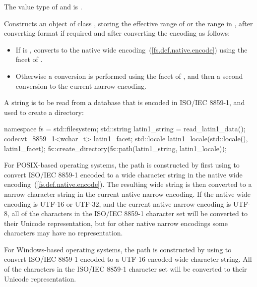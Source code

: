 \begin{itemdescr}
\pnum
\requires
The value type of  and  is
.

\pnum
\effects Constructs an object of class ,
storing the effective range of 
or the range  in ,
after converting format if required and after converting the encoding as
follows:
\begin{itemize}
\item
If  is , converts to the native
wide encoding~(\ref{fs.def.native.encode}) using the 
facet of .
\item
Otherwise a conversion is performed using the
 facet of , and then a second
conversion to the current narrow encoding.
\end{itemize}
\begin{example}
A string is to be read from a database
that is encoded in ISO/IEC 8859-1, and used to create a directory:
\begin{codeblock}
namespace fs = std::filesystem;
std::string latin1_string = read_latin1_data();
codecvt_8859_1<wchar_t> latin1_facet;
std::locale latin1_locale(std::locale(), latin1_facet);
fs::create_directory(fs::path(latin1_string, latin1_locale));
\end{codeblock}
For POSIX-based operating systems, the path is constructed by first using
 to convert ISO/IEC 8859-1 encoded
 to a wide character string in the native wide
encoding~(\ref{fs.def.native.encode}). The resulting wide string is then
converted to a narrow character
 string in the current native narrow encoding. If the
native wide encoding is UTF-16 or UTF-32, and the current native narrow
encoding is UTF-8, all of the characters in the ISO/IEC 8859-1 character set
will be converted to their Unicode representation, but for other native
narrow encodings some characters may have no representation.

For Windows-based operating systems, the path is constructed by
using  to convert ISO/IEC 8859-1 encoded
 to a UTF-16 encoded wide character 
string. All of the characters in the ISO/IEC 8859-1 character set will be
converted to their Unicode representation.
\end{example}
\end{itemdescr}

